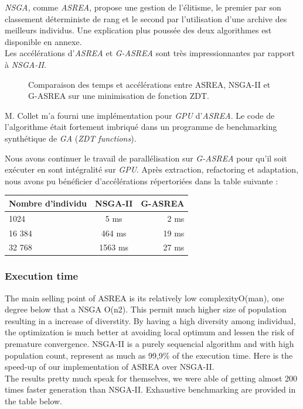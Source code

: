 \documentclass[12pt]{memoir}
\begin{document}
\bigskip
\emph{NSGA,} comme \emph{ASREA}, propose une gestion de l'élitisme, le
premier par son classement déterministe de rang et le second par
l'utilisation d'une archive des meilleurs individus. Une explication
plus poussée des deux algorithmes est disponible en annexe. \\
Les accélérations d'\emph{ASREA} et \emph{G-ASREA} sont très
impressionnantes par rapport à \emph{NSGA-II}.
\begin{figure}[htbp]
	\begin{center}
		\caption{Comparaison des temps et accélérations entre ASREA, NSGA-II et G-ASREA sur une minimisation de fonction ZDT\cite{zitzler2000comparison}.}
	\end{center}
\end{figure}
M. Collet m'a fourni une implémentation pour \textit{GPU} d'\emph{ASREA}. Le
code de l'algorithme était fortement imbriqué dans un programme de
benchmarking synthétique de \emph{GA} (\emph{ZDT functions\cite{zitzler2000comparison}}).

Nous avons continuer le travail de parallélisation sur \textit{G-ASREA} pour
qu'il soit exécuter en sont intégralité sur \textit{GPU}. Après extraction,
refactoring et adaptation, nous avons pu bénéficier d'accélérations
répertoriées dans la table suivante :

\begin{center}
	\begin{tabular}{ |l| c| r| }
		\hline
		Nombre d'individu & NSGA-II & G-ASREA \\
		\hline
		1024 & 5 ms & 2 ms \\
		16 384 & 464 ms & 19 ms\\
		32 768  & 1563 ms& 27 ms\\
		\hline
	\end{tabular}
\end{center}

\subsubsection{Execution time}
The main selling point of ASREA is its relatively low complexityO(man), one degree below that a NSGA O(n2). 
This permit much higher size of population resulting in a increase of diverstity. By having a high diversity 
among individual, the optimization is much better at avoiding local optimum and lessen the risk of premature 
convergence. NSGA-II is a purely sequencial algorithm and with high population count, represent as much as 
99,9\% of the execution time. Here is the speed-up of our implementation of ASREA over NSGA-II. \\
The results pretty much speak for themselves, we were able of getting almost 200 times faster generation 
than NSGA-II. Exhaustive benchmarking are provided in the table below.
 
\end{document}
